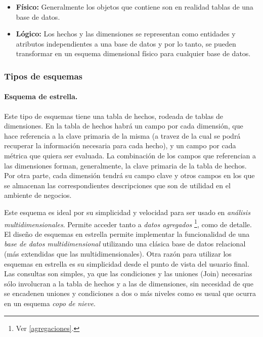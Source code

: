 \documentclass[a4paper,11pt]{article}
\begin{document}
    \begin{itemize}
      \item \textbf{Físico:} Generalmente los objetos que contiene son en realidad tablas de una base de datos.
      \item \textbf{Lógico:} Los hechos y las dimensiones se representan como entidades y atributos independientes a una base de datos y por lo tanto,
      se pueden transformar en un esquema dimensional físico para cualquier base de datos.
    \end{itemize}
    
    
    \subsubsection{Tipos de esquemas}
    
    \paragraph{Esquema de estrella.}
  
    Este tipo de esquemas tiene una tabla de hechos, rodeada de tablas de dimensiones. En la tabla de hechos habrá un campo por cada dimensión, que
    hace referencia a la clave primaria de la misma (a travez de la cual se podrá recuperar la información necesaria para cada hecho),
    y un campo por cada métrica que quiera ser evaluada. La combinación de los campos que referencian a las dimensiones forman, generalmente, la clave primaria de la
    tabla de hechos. Por otra parte, cada dimensión tendrá su campo clave y otros campos en los que se almacenan las correspondientes descripciones que son 
    de utilidad en el ambiente de negocios.
    
    Este esquema es ideal por su simplicidad y velocidad para ser usado en \textit{análisis multidimensionales}. Permite 
    acceder tanto a \textit{datos agregados} \footnote{Ver \ref{agregaciones}.}, como de detalle.
    El diseño de esquemas en estrella permite implementar la funcionalidad de una \textit{base de datos 
    multidimensional} utilizando una clásica base de datos relacional (más extendidas que las multidimensionales). Otra razón para utilizar los esquemas en 
    estrella es su simplicidad desde el punto de vista del usuario final. Las consultas son simples, ya que las condiciones y las uniones (Join) 
    necesarias sólo involucran a la tabla de hechos y a las de dimensiones, sin necesidad de que se encadenen uniones y condiciones a dos o más niveles como 
    es usual que ocurra en un esquema \textit{copo de nieve}.
    
\end{document}
